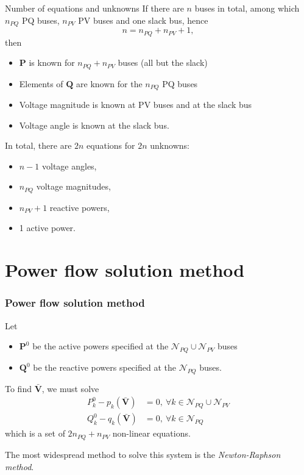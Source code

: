 \begin{frame}[allowframebreaks]{Number of equations and unknowns}
    If there are $n$ buses in total, among which $n_{PQ}$ PQ buses, $n_{PV}$ PV buses and one slack bus, hence
    $$ n = n_{PQ} + n_{PV} + 1,$$
    then
    \begin{itemize}
        \item $\mathbf{P}$ is known for $n_{PQ} + n_{PV}$ buses (all but the slack)
        \item Elements of $\mathbf{Q}$ are known for the $n_{PQ}$ PQ buses
        \item Voltage magnitude is known at PV buses and at the slack bus
        \item Voltage angle is known at the slack bus.
    \end{itemize}
    
    \vspace{1cm}
    
    In total, there are $2n$ equations for $2n$ unknowns:
    \begin{itemize}
        \item $n-1$ voltage angles, 
        \item $n_{PQ}$ voltage magnitudes, 
        \item $n_{PV} + 1$ reactive powers, 
        \item 1 active power.
    \end{itemize} 
\end{frame}

\section{Power flow solution method}

\begin{frame}
    \frametitle{Power flow solution method}
    Let
    \begin{itemize}
        \item $\mathbf{P}^0$ be the active powers specified at the $\mathcal{N}_{PQ} \cup \mathcal{N}_{PV}$ buses
        \item $\mathbf{Q}^0$ be the reactive powers specified at the $\mathcal{N}_{PQ}$ buses.
    \end{itemize}
    
    To find $\mathbf{\bar{V}}$, we must solve
    \begin{align*}
        P_k^0 - p_k(\mathbf{\bar{V}}) &= 0, \ \forall k \in \mathcal{N}_{PQ} \cup \mathcal{N}_{PV} \\
        Q_k^0 - q_k(\mathbf{\bar{V}}) &= 0, \ \forall k \in \mathcal{N}_{PQ}
    \end{align*}
    which is a set of $2 n_{PQ} + n_{PV}$ non-linear equations.
    
    The most widespread method to solve this system is the \textit{Newton-Raphson method}.
\end{frame}


